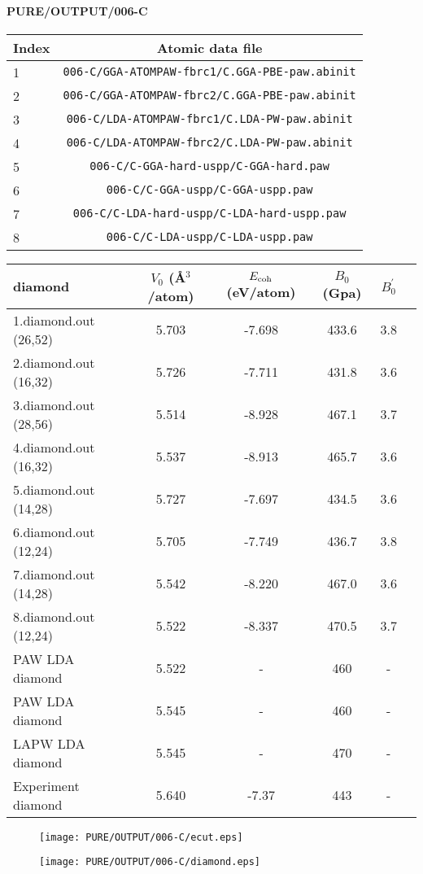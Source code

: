 \documentclass[onecolumn]{revtex4}
\begin{document}
\paragraph*{\bf{PURE/OUTPUT/006-C}}
\begin{center}
\begin{tabular}{lc}
\hline
Index & Atomic data file \\
\hline
1 & \verb?006-C/GGA-ATOMPAW-fbrc1/C.GGA-PBE-paw.abinit?\\
2 & \verb?006-C/GGA-ATOMPAW-fbrc2/C.GGA-PBE-paw.abinit?\\
3 & \verb?006-C/LDA-ATOMPAW-fbrc1/C.LDA-PW-paw.abinit?\\
4 & \verb?006-C/LDA-ATOMPAW-fbrc2/C.LDA-PW-paw.abinit?\\
5 & \verb?006-C/C-GGA-hard-uspp/C-GGA-hard.paw?\\
6 & \verb?006-C/C-GGA-uspp/C-GGA-uspp.paw?\\
7 & \verb?006-C/C-LDA-hard-uspp/C-LDA-hard-uspp.paw?\\
8 & \verb?006-C/C-LDA-uspp/C-LDA-uspp.paw?\\
\hline
\end{tabular}
\end{center}
\begin{center}
\begin{tabular}{lccccc}
\hline
\hline
\bf{diamond}&$V_0$ (\AA$^3$/atom)&$E_{\rm coh}$ (eV/atom)&$B_0$ (Gpa)&$B_0^{'}$& \\
\hline
1.diamond.out (26,52)& 5.703 &-7.698 & 433.6 & 3.8 & \\ 
2.diamond.out (16,32)& 5.726 &-7.711 & 431.8 & 3.6 & \\ 
3.diamond.out (28,56)& 5.514 &-8.928 & 467.1 & 3.7 & \\ 
4.diamond.out (16,32)& 5.537 &-8.913 & 465.7 & 3.6 & \\ 
5.diamond.out (14,28)& 5.727 &-7.697 & 434.5 & 3.6 & \\ 
6.diamond.out (12,24)& 5.705 &-7.749 & 436.7 & 3.8 & \\ 
7.diamond.out (14,28)& 5.542 &-8.220 & 467.0 & 3.6 & \\ 
8.diamond.out (12,24)& 5.522 &-8.337 & 470.5 & 3.7 & \\ 
PAW LDA diamond~\cite{Kresse_PRB59_1999} & 5.522  & - & 460 & - \\ %
PAW LDA diamond~\cite{Holzwarth_PRB55_1997} & 5.545 & - & 460 & - \\ %
LAPW LDA diamond~\cite{Holzwarth_PRB55_1997} & 5.545 & - & 470 & - \\ %
Experiment diamond~\cite{Kittel_1996} & 5.640 & -7.37 & 443 & - \\ %
\hline
\hline
\end{tabular}
\end{center}
\begin{figure}[h] 
\centering 
\texttt{[image: PURE/OUTPUT/006-C/ecut.eps]}
\end{figure}
\begin{figure}[h] 
\centering 
\texttt{[image: PURE/OUTPUT/006-C/diamond.eps]}
\end{figure}
\newpage
\end{document}
